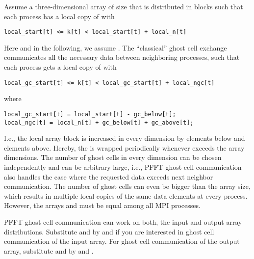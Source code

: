 Assume a three-dimensional array  of size  that is distributed in blocks such that each process has a local copy of
 with 
\begin{lstlisting}
local_start[t] <= k[t] < local_start[t] + local_n[t]
\end{lstlisting}
Here and in the following, we assume .
The ``classical'' ghost cell exchange communicates all the necessary data between neighboring processes,
such that each process gets a local copy of  with
\begin{lstlisting}
local_gc_start[t] <= k[t] < local_gc_start[t] + local_ngc[t]
\end{lstlisting}
where
\begin{lstlisting}
local_gc_start[t] = local_start[t] - gc_below[t];
local_ngc[t] = local_n[t] + gc_below[t] + gc_above[t];
\end{lstlisting}
I.e., the local array block is increased in every dimension by  elements below and  elements above.
Hereby, the  is wrapped periodically whenever  exceeds the array dimensions.
The number of ghost cells in every dimension can be chosen independently and can be arbitrary large, i.e.,
PFFT ghost cell communication also handles the case where the requested data exceeds next neighbor communication.
The number of ghost cells can even be bigger than the array size, which results in multiple local copies of the same data elements at every process.
However, the arrays  and  must be equal among all MPI processes.

PFFT ghost cell communication can work on both, the input and output array distributions.
Substitute  and  by  and  if you are interested in ghost cell communication of the input array. 
For ghost cell communication of the output array, substitute  and  by  and .

